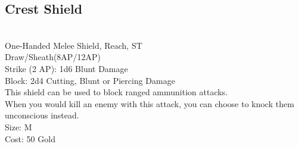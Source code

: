 \subsection{Crest Shield}\label{weapon:crestShield}\\
One-Handed Melee Shield,  Reach, ST\\
Draw/Sheath(8AP/12AP)\\
Strike (2 AP): 1d6 Blunt Damage\\
Block: 2d4 Cutting, Blunt or Piercing Damage\\
This shield can be used to block ranged ammunition attacks.\\
When you would kill an enemy with this attack, you can choose to knock them unconscious instead.\\
Size: M\\
Cost: 50 Gold\\